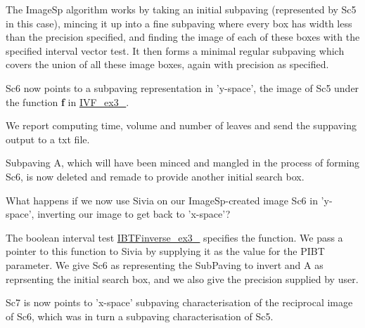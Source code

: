 \-The \-Image\-Sp algorithm works by taking an initial subpaving (represented by \-Sc5 in this case), mincing it up into a fine subpaving where every box has width less than the precision specified, and finding the image of each of these boxes with the specified interval vector test. \-It then forms a minimal regular subpaving which covers the union of all these image boxes, again with precision as specified.

\-Sc6 now points to a subpaving representation in 'y-\/space', the image of \-Sc5 under the function {\bfseries f} in \hyperlink{newsubpavings_NewIVF_ex3_4}{\-I\-V\-F\-\_\-ex3\-\_}.

\-We report computing time, volume and number of leaves and send the suppaving output to a txt file.


\begin{DoxyCodeInclude}

\end{DoxyCodeInclude}


\-Subpaving \-A, which will have been minced and mangled in the process of forming \-Sc6, is now deleted and remade to provide another initial search box.


\begin{DoxyCodeInclude}

\end{DoxyCodeInclude}


\-What happens if we now use \-Sivia on our \-Image\-Sp-\/created image \-Sc6 in 'y-\/space', inverting our image to get back to 'x-\/space'?


\begin{DoxyCodeInclude}

\end{DoxyCodeInclude}


\-The boolean interval test \hyperlink{newsubpavings_NewIBTFinverse_ex3_4}{\-I\-B\-T\-Finverse\-\_\-ex3\-\_} specifies the function. \-We pass a pointer to this function to \-Sivia by supplying it as the value for the \-P\-I\-B\-T parameter. \-We give \-Sc6 as representing the \-Sub\-Paving to invert and \-A as reprsenting the initial search box, and we also give the precision supplied by user.


\begin{DoxyCodeInclude}

\end{DoxyCodeInclude}


\-Sc7 is now points to 'x-\/space' subpaving characterisation of the reciprocal image of \-Sc6, which was in turn a subpaving characterisation of \-Sc5.

